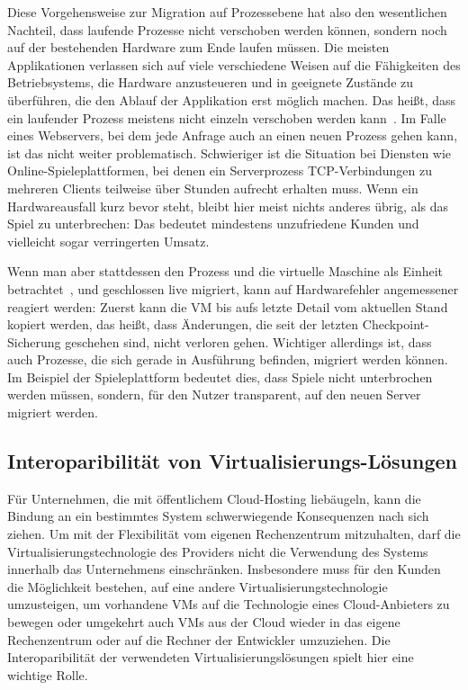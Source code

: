 Diese Vorgehensweise zur Migration auf Prozessebene hat also den
wesentlichen Nachteil, dass laufende Prozesse nicht verschoben werden
können, sondern noch auf der bestehenden Hardware zum Ende laufen
müssen. Die meisten Applikationen verlassen sich auf viele
verschiedene Weisen auf die Fähigkeiten des Betriebsystems, die
Hardware anzusteueren und in geeignete Zustände zu überführen, die den
Ablauf der Applikation erst möglich machen. Das heißt, dass ein
laufender Prozess meistens nicht einzeln verschoben werden
kann~\cite{hansen2002nomadic}. Im Falle eines Webservers, bei dem
jede Anfrage auch an einen neuen Prozess gehen kann, ist das nicht
weiter problematisch. Schwieriger ist die Situation bei Diensten wie
\zB Online-Spieleplattformen, bei denen ein Serverprozess
TCP-Verbindungen zu mehreren Clients teilweise über Stunden aufrecht
erhalten muss. Wenn ein Hardwareausfall kurz bevor steht, bleibt hier
meist nichts anderes übrig, als das Spiel zu unterbrechen: Das 
bedeutet mindestens unzufriedene Kunden und vielleicht sogar
verringerten Umsatz.

Wenn man aber stattdessen den Prozess und die virtuelle Maschine als
Einheit betrachtet~\cite{nelson2005fast}, und geschlossen live
migriert, kann auf Hardwarefehler angemessener reagiert werden: Zuerst
kann die \ac{VM} bis aufs letzte Detail vom aktuellen Stand kopiert werden,
das heißt, dass Änderungen, die seit der letzten Checkpoint-Sicherung
geschehen sind, nicht verloren gehen. Wichtiger allerdings ist, dass
auch Prozesse, die sich gerade in Ausführung befinden, migriert werden
können. Im Beispiel der Spieleplattform bedeutet dies, dass Spiele
nicht unterbrochen werden müssen, sondern, für den Nutzer transparent,
auf den neuen Server migriert werden.

\subsection{Interoparibilität von Virtualisierungs-Lösungen}
Für Unternehmen, die mit öffentlichem Cloud-Hosting liebäugeln, kann
die Bindung an ein bestimmtes System schwerwiegende Konsequenzen nach
sich ziehen. Um mit der Flexibilität vom eigenen Rechenzentrum
mitzuhalten, darf die Virtualisierungstechnologie des Providers nicht
die Verwendung des Systems innerhalb das Unternehmens
einschränken. Insbesondere muss für den Kunden die Möglichkeit
bestehen, auf eine andere Virtualisierungstechnologie umzusteigen, um
\zB vorhandene \acp{VM} auf die Technologie eines Cloud-Anbieters zu
bewegen oder umgekehrt auch \acp{VM} aus der Cloud wieder in das eigene
Rechenzentrum oder auf die Rechner der Entwickler umzuziehen. Die
Interoparibilität der verwendeten Virtualisierungslösungen spielt hier
eine wichtige Rolle.

